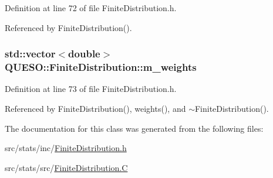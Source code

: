 Definition at line 72 of file Finite\-Distribution.\-h.



Referenced by Finite\-Distribution().

\hypertarget{class_q_u_e_s_o_1_1_finite_distribution_a37ce51dce9fa6b755277281d6dd7c052}{
\subsubsection[{m\-\_\-weights}]{\setlength{\rightskip}{0pt plus 5cm}std\-::vector$<$double$>$ Q\-U\-E\-S\-O\-::\-Finite\-Distribution\-::m\-\_\-weights\hspace{0.3cm}{\ttfamily [protected]}}}\label{class_q_u_e_s_o_1_1_finite_distribution_a37ce51dce9fa6b755277281d6dd7c052}


Definition at line 73 of file Finite\-Distribution.\-h.



Referenced by Finite\-Distribution(), weights(), and $\sim$\-Finite\-Distribution().



The documentation for this class was generated from the following files\-:\begin{DoxyCompactItemize}
\item 
src/stats/inc/\hyperlink{_finite_distribution_8h}{Finite\-Distribution.\-h}\item 
src/stats/src/\hyperlink{_finite_distribution_8_c}{Finite\-Distribution.\-C}\end{DoxyCompactItemize}
